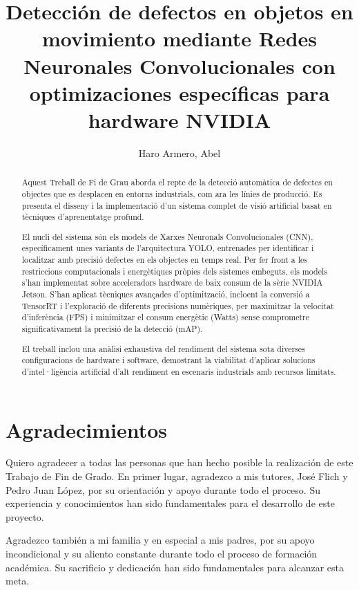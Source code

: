\documentclass[11pt,spanish,listoffigures,listoftables]{tfgetsinf}
\title{Detección de defectos en objetos en movimiento mediante Redes Neuronales Convolucionales con optimizaciones específicas para hardware NVIDIA}
\author{Haro Armero, Abel}
\begin{document}
\chapter*{Agradecimientos} \label{chap:agradecimientos}

Quiero agradecer a todas las personas que han hecho posible la realización de este Trabajo de Fin de Grado. En primer lugar, agradezco a mis tutores, José Flich y Pedro Juan López, por su orientación y apoyo durante todo el proceso. Su experiencia y conocimientos han sido fundamentales para el desarrollo de este proyecto.

Agradezco también a mi familia y en especial a mis padres, por su apoyo incondicional y su aliento constante durante todo el proceso de formación académica. Su sacrificio y dedicación han sido fundamentales para alcanzar esta meta.

\cleardoublepage


\begin{abstract}
Aquest Treball de Fi de Grau aborda el repte de la detecció automàtica de defectes en objectes que es desplacen en entorns industrials, com ara les línies de producció. Es presenta el disseny i la implementació d'un sistema complet de visió artificial basat en tècniques d'aprenentatge profund.

El nucli del sistema són els models de Xarxes Neuronals Convolucionales (CNN), específicament unes variants de l'arquitectura YOLO, entrenades per identificar i localitzar amb precisió defectes en els objectes en temps real. Per fer front a les restriccions computacionals i energètiques pròpies dels sistemes embeguts, els models s'han implementat sobre acceleradors hardware de baix consum de la sèrie NVIDIA Jetson. S'han aplicat tècniques avançades d'optimització, incloent la conversió a TensorRT i l'exploració de diferents precisions numèriques, per maximitzar la velocitat d'inferència (FPS) i minimitzar el consum energètic (Watts) sense comprometre significativament la precisió de la detecció (mAP).

El treball inclou una anàlisi exhaustiva del rendiment del sistema sota diverses configuracions de hardware i software, demostrant la viabilitat d'aplicar solucions d'intel·ligència artificial d'alt rendiment en escenaris industrials amb recursos limitats.
\end{abstract}
\end{document}
